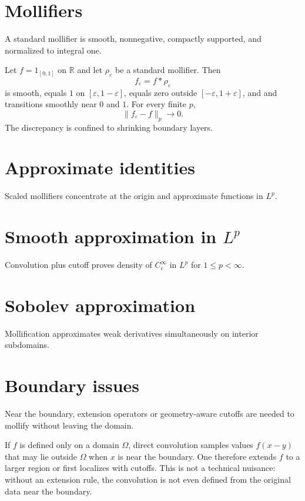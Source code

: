 \section{Mollifiers}
A standard mollifier is smooth, nonnegative, compactly supported, and normalized to integral one.


\begin{example}\label{ex:iii22-expand-01}
Let \(f=1_{[0,1]}\) on \(\mathbb R\) and let \(\rho_\varepsilon\) be a standard
mollifier. Then
\[
f_\varepsilon=f*\rho_\varepsilon
\]
is smooth, equals \(1\) on \([\varepsilon,1-\varepsilon]\), equals zero outside \([-\varepsilon,1+\varepsilon]\), and and transitions smoothly near \(0\) and \(1\). For every finite
\(p\),
\[
\|f_\varepsilon-f\|_p\to0.
\]
The discrepancy is confined to shrinking boundary layers.
\end{example}
\section{Approximate identities}
Scaled mollifiers concentrate at the origin and approximate functions in $L^p$.

\section{Smooth approximation in $L^p$}
Convolution plus cutoff proves density of $C_c^\infty$ in $L^p$ for $1\le p<\infty$.

\section{Sobolev approximation}
Mollification approximates weak derivatives simultaneously on interior subdomains.

\section{Boundary issues}
Near the boundary, extension operators or geometry-aware cutoffs are needed to mollify without leaving the domain.


\begin{example}\label{ex:iii22-expand-02}
If \(f\) is defined only on a domain \(\Omega\), direct convolution samples
values \(f(x-y)\) that may lie outside \(\Omega\) when \(x\) is near the
boundary. One therefore extends \(f\) to a larger region or first localizes
with cutoffs. This is not a technical nuisance: without an extension rule,
the convolution is not even defined from the original data near the boundary.
\end{example}
